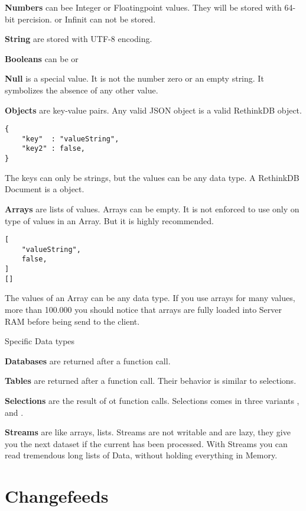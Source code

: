 \textbf{Numbers} can bee Integer or Floatingpoint values. 
They will be stored with 64-bit percision.
 or Infinit can not be stored.

\textbf{String} are stored with UTF-8 encoding.

\textbf{Booleans} can be  or 

\textbf{Null} is a special value.
It is not the number zero or an empty string.
It symbolizes the absence of any other value.

\textbf{Objects} are key-value pairs.
Any valid JSON object is a valid RethinkDB object.
\begin{lstlisting}[frame=single, caption=example Object, label=refdoc]
{
	"key"  : "valueString",
	"key2" : false,
}
\end{lstlisting}
The keys can only be strings, but the values can be any data type.
A RethinkDB Document is a object.

\textbf{Arrays} are lists of values.
Arrays can be empty.
It is not enforced to use only on type of values in an Array.
But it is highly recommended.
\begin{lstlisting}[frame=single, caption=example Arrays, label=refdoc]
[
	"valueString",
	false,
]
[]
\end{lstlisting}
The values of an Array can be any data type.
If you use arrays for many values, more than 100.000 you should notice that arrays are fully loaded into Server RAM before being send to the client.

Specific Data types

\textbf{Databases} are returned after a  function call.

\textbf{Tables} are returned after a  function call.
Their behavior is similar to selections.

\textbf{Selections} are the result of  ot  function calls.
Selections comes in three variants ,  and .

\textbf{Streams} are like arrays, lists.
Streams are not writable and are lazy, they give you the next dataset if the current has been processed.
With Streams you can read tremendous long lists of Data, without holding everything in Memory.


\section{Changefeeds}

